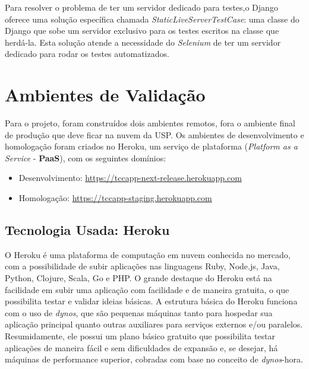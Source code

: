 Para resolver o problema de ter um servidor dedicado para testes,o Django oferece uma solução específica chamada \textit{StaticLiveServerTestCase}\cite{staticfiles2018}: uma classe do Django que sobe um servidor exclusivo para os testes escritos na classe que herdá-la. Esta solução atende a necessidade do \textit{Selenium} de ter um servidor dedicado para rodar os testes automatizados.

\section{Ambientes de Validação}
Para o projeto, foram construídos dois ambientes remotos, fora o ambiente final de produção que deve ficar na nuvem da USP. Os ambientes de desenvolvimento e homologação foram criados no Heroku, um serviço de plataforma (\textit{Platform as a Service} - \textbf{PaaS}), com os seguintes domínios:

\begin{itemize}
    \item Desenvolvimento: \href{https://tccapp-next-release.herokuapp.com}{https://tccapp-next-release.herokuapp.com}
    \item Homologação: \href{https://tccapp-staging.herokuapp.com}{https://tccapp-staging.herokuapp.com}
\end{itemize}

\subsection{Tecnologia Usada: Heroku}
O Heroku é uma plataforma de computação em nuvem conhecida no mercado, com a possibilidade de subir aplicações nas linguagens Ruby, Node.js, Java, Python, Clojure, Scala, Go e PHP. O grande destaque do Heroku está na facilidade em subir uma aplicação com facilidade e de maneira gratuita, o que possibilita testar e validar ideias básicas. A estrutura básica do Heroku funciona com o uso de \textit{dynos}, que são pequenas máquinas tanto para hospedar sua aplicação principal quanto outras auxiliares para serviços externos e/ou paralelos. Resumidamente, ele possui um plano básico gratuito que possibilita testar aplicações de maneira fácil e sem dificuldades de expansão e, se desejar, há máquinas de performance superior, cobradas com base no conceito de \textit{dynos}-hora.




